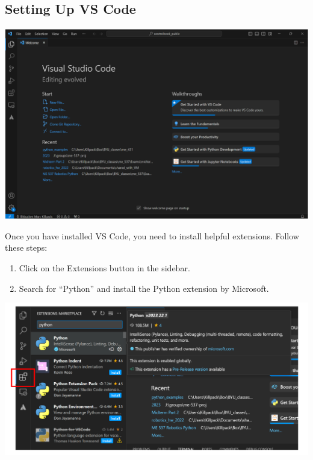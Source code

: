 \documentclass{article}
\begin{document}
\subsection{Setting Up VS Code}
\begin{center}
    \includegraphics[width=\linewidth]{pic1-vsCodestarter.png} %
\end{center}
Once you have installed VS Code, you need to install helpful extensions. Follow these steps:

\begin{enumerate}
    \item Click on the Extensions button in the sidebar.
    \item Search for ``Python'' and install the Python extension by Microsoft.
\end{enumerate}


\begin{center}
    \includegraphics[width=\linewidth]{pic2-vsCodeExtensions.png}
\end{center}
\end{document}
